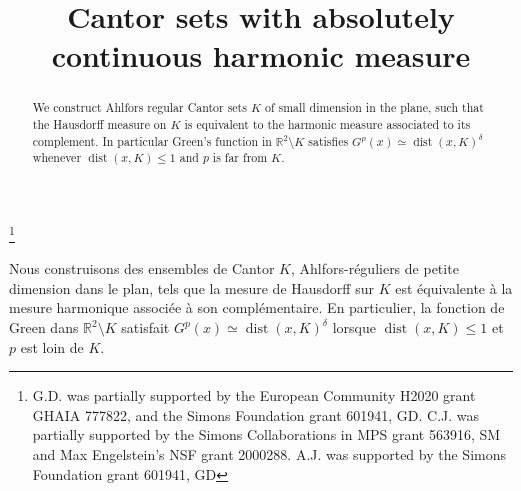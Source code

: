 \documentclass[JEP,XML,SOM,Unicode,published]{cedram}
\let\sm\setminus
\numberwithin{equation}{section}
\theoremstyle{plain}
\theoremstyle{definition}
\newcommand{\R}{\mathbb{R}}
\let\sm\setminus
\DeclareMathOperator{\dist}{dist}
\newcommand{\R}{\mathbb{R}}
\DeclareMathOperator{\dist}{dist}
\begin{document}
\title{Cantor sets with absolutely continuous harmonic measure}

\author[\initial{G.} \lastname{David}]{ }
\address{Université Paris-Saclay, CNRS,
Laboratoire de mathématiques d'Orsay\\
91405 Orsay, France}

\author[\initial{C.} \lastname{Jeznach}]{ }
\address{School of Mathematics, University of Minnesota\\
Minneapolis, MN, 55455, USA}

\author[\initial{A.} \lastname{Julia}]{ }
\address{Université Paris-Saclay, CNRS,
Laboratoire de mathématiques d'Orsay\\
91405 Orsay, France}

\thanks{G.D. was partially supported by the European Community H2020 grant GHAIA 777822, and the Simons Foundation grant 601941, GD. C.J. was partially supported by the Simons Collaborations in MPS grant 563916, SM and Max Engelstein's NSF grant 2000288. A.J. was supported by the Simons Foundation grant 601941, GD}

\begin{abstract}
We construct Ahlfors regular Cantor sets $K$ of small dimension in the plane, such that the Hausdorff measure on $K$ is equivalent to the harmonic measure associated to its complement. In particular Green's function in $\R^2 \sm K$ satisfies $G^p(x)\simeq \dist(x,K)^\delta$ whenever $\dist(x,K)\le 1$ and $p$ is far from $K$.
\end{abstract}





\begin{altabstract}
Nous construisons des ensembles de Cantor $K$, Ahlfors-réguliers de petite dimension dans le plan, tels que la mesure de Hausdorff sur $K$ est équivalente à la mesure harmonique associée à son complémentaire. En particulier, la fonction de Green dans $\R^2 \sm K$ satisfait $G^p(x)\simeq \dist(x,K)^\delta$ lorsque $\dist(x,K)\le 1$ et $p$ est loin de $K$.
\end{altabstract}
\end{document}
